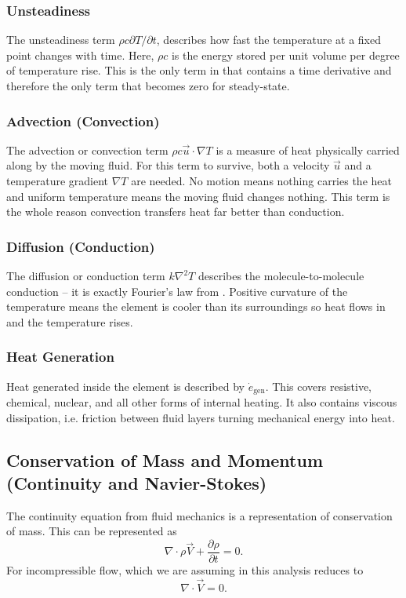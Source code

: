 \subsubsection{Unsteadiness} \label{sec:unsteady}
The unsteadiness term $\rho c \partial T / \partial t$, describes how fast the temperature at a fixed point changes with time.
Here, $\rho c$ is the energy stored per unit volume per degree of temperature rise.
This is the only term in  that contains a time derivative and therefore the only term that becomes zero for steady-state.

\subsubsection[Advection]{Advection (Convection)} \label{sec:advection}
The advection or convection term $\rho c \Vec{u} \cdot \nabla T$ is a measure of heat physically carried along by the moving fluid.
For this term to survive, both a velocity $\Vec{u}$ and a temperature gradient $\nabla T$ are needed.
No motion means nothing carries the heat and uniform temperature means the moving fluid changes nothing.
This term is the whole reason convection transfers heat far better than conduction.

\subsubsection[Diffusion]{Diffusion (Conduction)} \label{sec:diffusion}
The diffusion or conduction term $k \nabla^2 T$ describes the molecule-to-molecule conduction -- it is exactly Fourier's law from .
Positive curvature of the temperature means the element is cooler than its surroundings so heat flows in and the temperature rises.

\subsubsection{Heat Generation} \label{sec:heatgen}
Heat generated inside the element is described by $\dot{e}_{\mathrm{gen}}$.
This covers resistive, chemical, nuclear, and all other forms of internal heating.
It also contains viscous dissipation, i.e. friction between fluid layers turning mechanical energy into heat.

\subsection[Conservation of Mass and Momentum]{Conservation of Mass and Momentum (Continuity and Navier-Stokes)}
The continuity equation from fluid mechanics is a representation of conservation of mass.
This can be represented as 
\begin{equation} \label{eq:contcomp}
  \nabla \cdot \rho \Vec{V} + \frac{\partial \rho}{\partial t} =0
.\end{equation}
For incompressible flow, which we are assuming in this analysis  reduces to
\begin{equation} \label{eq:contincomp}
  \nabla \cdot \Vec{V} = 0
.\end{equation}

